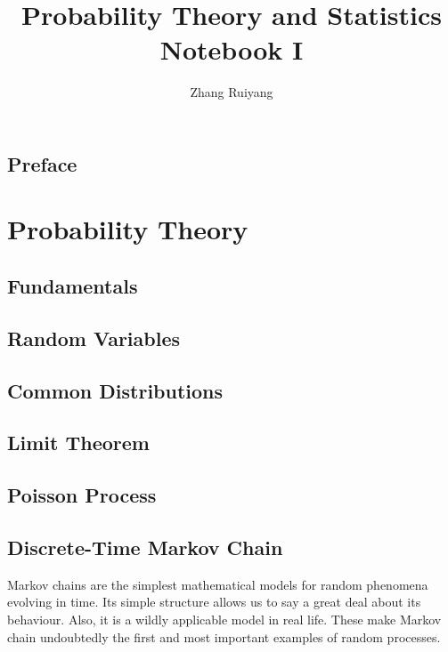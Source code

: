 \documentclass[11pt, a4paper, oneside]{book}
\theoremstyle{definition}
\begin{document}
\frontmatter 

\title{\huge Probability Theory and Statistics Notebook I}
\author{\Large{Zhang Ruiyang}}
\date{}
\maketitle

\tableofcontents

\newpage

\chapter*{Preface}

\mainmatter

\part{Probability Theory} 

\chapter{Fundamentals}
\chapter{Random Variables}
\chapter{Common Distributions}
\chapter{Limit Theorem}
\chapter{Poisson Process}


\chapter{Discrete-Time Markov Chain}

\noindent Markov chains are the simplest mathematical models for random phenomena evolving in time. Its simple structure allows us to say a great deal about its behaviour. Also, it is a wildly applicable model in real life. These make Markov chain undoubtedly the first and most important examples of random processes. 
\end{document}
